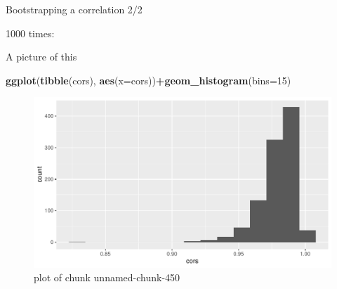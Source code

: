 \documentclass[
  ignorenonframetext,
]{beamer}
\newenvironment{Shaded}{\begin{snugshade}}{\end{snugshade}}
\newcommand{\DataTypeTok}[1]{\textcolor[rgb]{0.13,0.29,0.53}{#1}}
\newcommand{\DecValTok}[1]{\textcolor[rgb]{0.00,0.00,0.81}{#1}}
\newcommand{\KeywordTok}[1]{\textcolor[rgb]{0.13,0.29,0.53}{\textbf{#1}}}
\newcommand{\NormalTok}[1]{#1}
\newcommand{\OperatorTok}[1]{\textcolor[rgb]{0.81,0.36,0.00}{\textbf{#1}}}
\newcommand{\StringTok}[1]{\textcolor[rgb]{0.31,0.60,0.02}{#1}}
\begin{document}
\begin{frame}[fragile]{Bootstrapping a correlation 2/2}
\protect\hypertarget{bootstrapping-a-correlation-22}{}

1000 times:

\begin{Shaded}
\end{Shaded}

\end{frame}

\begin{frame}[fragile]{A picture of this}
\protect\hypertarget{a-picture-of-this}{}

\begin{Shaded}
\begin{Highlighting}[]
\KeywordTok{ggplot}\NormalTok{(}\KeywordTok{tibble}\NormalTok{(cors), }\KeywordTok{aes}\NormalTok{(}\DataTypeTok{x=}\NormalTok{cors))}\OperatorTok{+}\KeywordTok{geom_histogram}\NormalTok{(}\DataTypeTok{bins=}\DecValTok{15}\NormalTok{)}
\end{Highlighting}
\end{Shaded}

\begin{figure}
\centering
\includegraphics{figure/unnamed-chunk-450-1.pdf}
\caption{plot of chunk unnamed-chunk-450}
\end{figure}

\end{frame}
\end{document}
